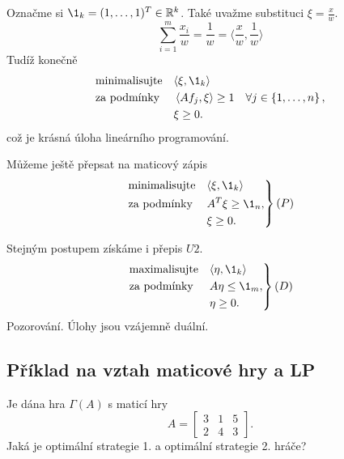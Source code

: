 Označme si $\1_k = (1, \dots, 1)^T \in \R^k$. Také uvažme substituci $\xi = \frac{x}{w}$.
\[
    \sum_{i=1}^{m} \frac{x_i}{w} = \frac{1}{w} = \langle \frac{x}{w}, \frac{1}{w}\rangle
\]
Tudíž konečně
\[
\begin{aligned}
    &\text{minimalisujte}&& \langle \xi, \1_k\rangle \\
    &\text{za podmínky}  && \left\langle A f_j, \xi\right\rangle \geq 1 \quad \forall j \in \bc{1, \dots, n}, \\
    &\phantom{\text{za podmínky}}&&\xi \geq 0.
\end{aligned}
\]
což je krásná úloha lineárního programování.

Můžeme ještě přepsat na maticový zápis
\[
\left.\begin{aligned}
    &\text{minimalisujte}&& \langle \xi, \1_k\rangle \\
    &\text{za podmínky}  && A^T \xi \geq \1_n, \\
    &\phantom{\text{za podmínky}}&&\xi \geq 0.
\end{aligned}
\right\} (P)
\]

Stejným postupem získáme i přepis $U2$.
\[
\left.\begin{aligned}
    &\text{maximalisujte}&& \langle \eta, \1_k\rangle \\
    &\text{za podmínky}  &&  A \eta \leq \1_m, \\
    &\phantom{\text{za podmínky}}&&\eta \geq 0.
\end{aligned}
\right\} (D)
\]
Pozorování. Úlohy jsou vzájemně duální.

\subsection{Příklad na vztah maticové hry a LP}
Je dána hra $\Gamma(A)$ s maticí hry
\[
    A = 
    \begin{bmatrix}
        3 & 1 & 5 \\
        2 & 4 & 3    
    \end{bmatrix}.
\]
Jaká je optimální strategie 1. a optimální strategie 2. hráče?

